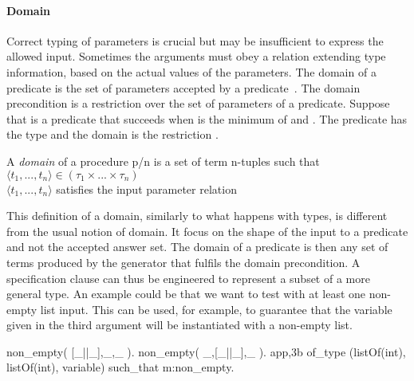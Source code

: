 \paragraph{\bf Domain}

Correct typing of parameters is crucial but may be insufficient to
express the allowed input.
%
Sometimes the arguments must obey a relation extending type information,
based on the actual values of the parameters.
%
The domain of a predicate is the set of parameters accepted by a
predicate~\cite{Deville1990logprog}.
%
The domain precondition is a restriction over the set of parameters of a
predicate.
%
Suppose that  is a predicate that succeeds when
 is the minimum of  and .
%
The predicate has the type  and the domain is the
restriction .


\begin{definition}
\label{def:domain}
A {\em domain} of a procedure p/n is a set of term
n-tuples such that\\
\qquad $\langle t_1,...,t_n \rangle \in (\tau_1 \times ... \times
\tau_n)$\\
\qquad $\langle t_1,...,t_n \rangle$ satisfies the input parameter relation
\end{definition}


This definition of a domain, similarly to what happens with types, is
different from the usual notion of domain.
%
It focus on the shape of the input to a predicate and not the accepted
answer set.
%
The \plqc{} domain of a predicate is then any set of terms produced by
the generator that fulfils the domain precondition.
%
%
A specification clause can thus be engineered to represent a subset of
a more general type.
%
An example could be that we want to test  with at least one
non-empty list input.
%
This can be used, for example, to guarantee that the variable given in
the third argument will be instantiated with a non-empty list.
\begin{yapcode}
 non_empty( {[_||_],_,_} ).
 non_empty( {_,[_||_],_} ).
 {app,3b} of_type (listOf(int), listOf(int), variable)
    such_that m:non_empty.
\end{yapcode}



